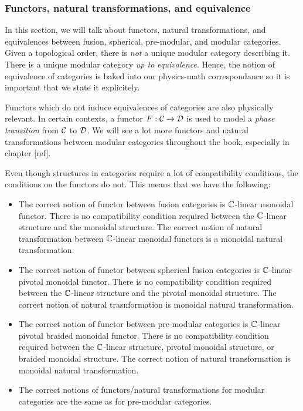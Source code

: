 \subsubsection{Functors, natural transformations, and equivalence}

In this section, we will talk about functors, natural transformations, and equivalences between fusion, spherical, pre-modular, and modular categories. Given a topological order, there is \textit{not} a unique modular category describing it. There is a unique modular category \textit{up to equivalence}. Hence, the notion of equivalence of categories is baked into our physics-math correspondance so it is important that we state it explicitely.

Functors which do not induce equivalences of categories are also physically relevant. In certain contexts, a functor $F:{\mathcal C}\to {\mathcal D}$ is used to model a \textit{phase transition} from ${\mathcal C}$ to ${\mathcal D}$. We will see a lot more functors and natural transformations between modular categories throughout the book, especially in chapter [ref].

Even though structures in categories require a lot of compatibility conditions, the conditions on the functors do not. This means that we have the following:

\begin{itemize}
\item The correct notion of functor between fusion categories is ${\mathbb C}$-linear monoidal functor. There is no compatibility condition required between the ${\mathbb C}$-linear structure and the monoidal structure. The correct notion of natural transformation between ${\mathbb C}$-linear monoidal functors is a monoidal natural transformation.

\item The correct notion of functor between spherical fusion categories is ${\mathbb C}$-linear pivotal monoidal functor. There is no compatibility condition required between the ${\mathbb C}$-linear structure and the pivotal monoidal structure. The correct notion of natural trasnformation is monoidal natural transformation.

\item The correct notion of functor between pre-modular categories is ${\mathbb C}$-linear pivotal braided monoidal functor. There is no compatibility condition required between the ${\mathbb C}$-linear structure, pivotal monoidal structure, or braided monoidal structure. The correct notion of natural transformation is monoidal natural transformation.

\item The correct notions of functors/natural transformations for modular categories are the same as for pre-modular categories.

\end{itemize}


